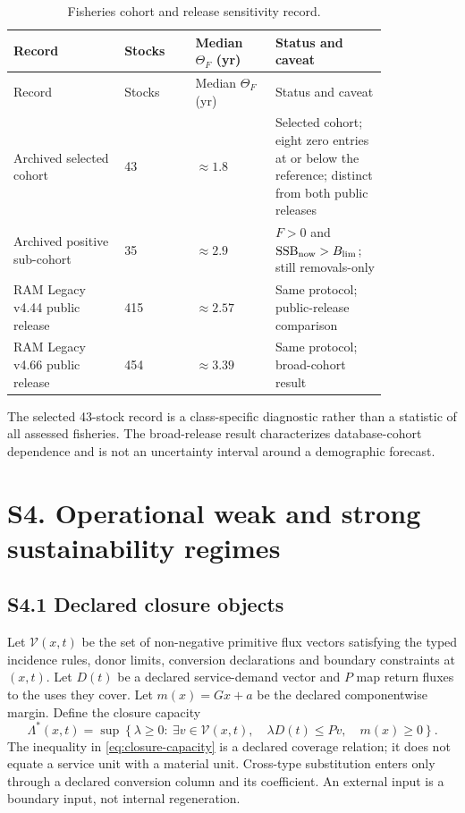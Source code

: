 \documentclass[11pt]{article}
\begin{document}
\begin{longtable}{@{}P{0.25\linewidth}P{0.16\linewidth}P{0.18\linewidth}P{0.24\linewidth}@{}}
\caption{Fisheries cohort and release sensitivity record.}\label{tab:fisheries}\\
\toprule
Record & Stocks & Median $\Theta_F$ (yr) & Status and caveat \\
\midrule
\endfirsthead
\toprule
Record & Stocks & Median $\Theta_F$ (yr) & Status and caveat \\
\midrule
\endhead
\bottomrule
\endfoot
Archived selected cohort & 43 & $\approx1.8$ & Selected cohort; eight zero entries at or below the reference; distinct from both public releases \\
Archived positive sub-cohort & 35 & $\approx2.9$ & $F>0$ and $\mathrm{SSB}_{\rm now}>B_{\rm lim}$; still removals-only \\
RAM Legacy v4.44 public release & 415 & $\approx2.57$ & Same protocol; public-release comparison \\
RAM Legacy v4.66 public release & 454 & $\approx3.39$ & Same protocol; broad-cohort result \\
\end{longtable}

The selected 43-stock record is a class-specific diagnostic rather than a statistic of all assessed fisheries. The broad-release result characterizes database-cohort dependence and is not an uncertainty interval around a demographic forecast.

\section*{S4. Operational weak and strong sustainability regimes}

\subsection*{S4.1 Declared closure objects}

Let $\mathcal V(x,t)$ be the set of non-negative primitive flux vectors satisfying the typed incidence rules, donor limits, conversion declarations and boundary constraints at $(x,t)$. Let $D(t)$ be a declared service-demand vector and $P$ map return fluxes to the uses they cover. Let $m(x)=Gx+a$ be the declared componentwise margin. Define the closure capacity
\begin{equation}
\Lambda^*(x,t)=\sup\left\{\lambda\geq0:\ \exists v\in\mathcal V(x,t),\quad
\lambda D(t)\leq Pv,\quad m(x)\geq0\right\}.
\label{eq:closure-capacity}
\end{equation}
The inequality in \eqref{eq:closure-capacity} is a declared coverage relation; it does not equate a service unit with a material unit. Cross-type substitution enters only through a declared conversion column and its coefficient. An external input is a boundary input, not internal regeneration.
\end{document}
